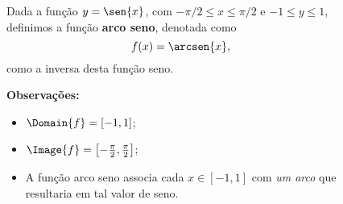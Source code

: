 \begin{frame}
  \begin{columns}[onlytextwidth]
    \begin{column}{0.49\textwidth}\vspace{-0.5cm}
      \begin{definition}
        Dada a função $y=\sen{x}$, com $-\pi/2\leq x\leq \pi/2$ e $-1\leq y\leq 1$, definimos a função \textbf{arco seno}, denotada como
        \begin{equation*}
          f(x) = \arcsen{x},
        \end{equation*}
        como a inversa desta função seno.
      \end{definition}
      \begin{highlight}
        \textbf{Observações:}
        \begin{itemize}
          \item $\Domain{f} = [-1,1]$;
          \item $\Image{f} = \left[-\frac{\pi}{2},\frac{\pi}{2}\right]$;
          \item A função arco seno associa cada $x\in[-1,1]$ com \emph{um arco} que resultaria em tal valor de seno.
        \end{itemize}
      \end{highlight}
    \end{column}
    \begin{column}{0.49\textwidth}\vspace*{-0.5cm}
      \begin{figure}
      \end{figure}
    \end{column}
  \end{columns}
\end{frame}


